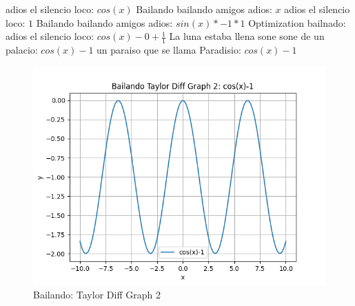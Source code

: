 \documentclass{article}
\begin{document}
adios el silencio loco: $cos(x)$  \newline Bailando bailando amigos adios: $x$ adios el silencio loco: $1$  \newline Bailando bailando amigos adios: $sin(x)*-1*1$  \newline \newline Optimization bailnado: \newline adios el silencio loco: $cos(x)-0+\frac{1}{1}$  \newline La luna estaba llena sone sone de un palacio: $cos(x)-1$  \newline un paraiso que se llama Paradisio: $cos(x)-1$  \newline \begin{figure}
\centering
\includegraphics[width=0.8\linewidth]{Bailando Taylor Diff Graph 2.png}
\caption{Bailando: Taylor Diff Graph 2}
\label{fig:my_image}
\end{figure}
\end{document}

